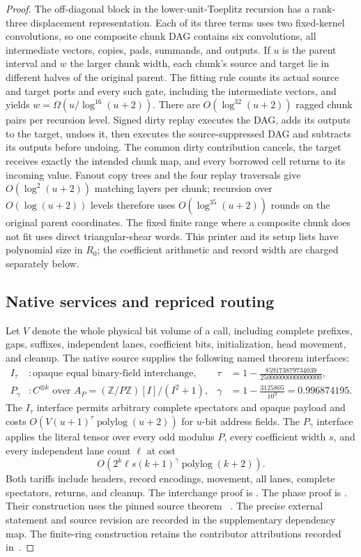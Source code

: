 \begin{proof}
The off-diagonal block in the lower-unit-Toeplitz recursion has a
rank-three displacement representation.  Each of its three terms uses
two fixed-kernel convolutions, so one composite chunk DAG contains six
convolutions, all intermediate vectors, copies, pads, summands, and
outputs.  If $u$ is the parent interval and $w$ the larger chunk width,
each chunk's source and target lie in different halves of the original
parent.  The fitting rule counts its actual source and target ports and
every such gate, including the intermediate vectors, and yields
$w=\Omega(u/\log^{16}(u+2))$.  There are
$O(\log^{32}(u+2))$ ragged chunk pairs per recursion level.  Signed dirty
replay executes the DAG, adds its outputs to the target, undoes it, then
executes the source-suppressed DAG and subtracts its outputs before
undoing.  The common dirty contribution cancels, the target receives
exactly the intended chunk map, and every borrowed cell returns to its
incoming value.  Fanout copy trees and the four replay traversals give
$O(\log^2(u+2))$ matching layers per chunk; recursion over
$O(\log(u+2))$ levels therefore uses $O(\log^{35}(u+2))$ rounds on the
original parent coordinates.  The fixed finite range where a composite
chunk does not fit uses direct triangular-shear words.  This printer and its setup lists have
polynomial size in $R_0$; the coefficient arithmetic and record width
are charged separately below.
\subsection{Native services and repriced routing}
\label{upd:native}

Let $V$ denote the whole physical bit volume of a call, including complete
prefixes, gaps, suffixes, independent lanes, coefficient bits,
initialization, head movement, and cleanup.  The native
source supplies the following named theorem interfaces:
\begin{align*}
  I_\tau &: \text{opaque equal binary-field interchange},
  &\tau&=1-\frac{859173879734039}{250000000000000000},\\
  P_\gamma &: C^{\otimes k}\text{ over }
      A_P=(\mathbb Z/P\mathbb Z)[I]/(I^2+1),
  &\gamma&=1-\frac{3125805}{10^9}=0.996874195.
\end{align*}
The $I_\tau$ interface permits arbitrary complete spectators and opaque
payload and costs $O(V(u+1)^\tau\operatorname{polylog}(u+2))$ for $u$-bit
address fields.  The $P_\gamma$ interface applies the literal tensor over
every odd modulus $P$, every coefficient width $s$, and every independent
lane count $\ell$ at cost
\[
  O\!\left(2^k\ell s(k+1)^\gamma
                   \operatorname{polylog}(k+2)\right).
\]
Both tariffs include headers, record encodings, movement, all lanes,
complete spectators, returns, and cleanup.  The interchange proof is
.  The phase proof is
.  Their construction uses the pinned source
theorem ~\cite{Stage2Machine26}.
The precise external statement and source revision are recorded in the
supplementary dependency map.
The finite-ring construction retains the contributor attributions recorded
in~\cite{Community26}.


\end{proof}

